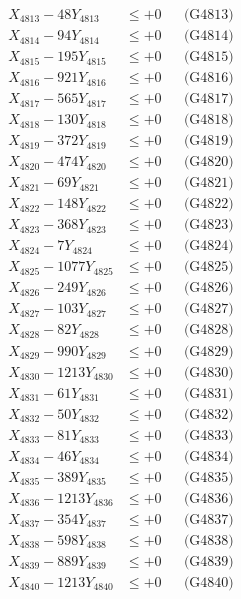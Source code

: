 \documentclass[a4paper,10pt]{article}
\begin{document}
{\begin{align}
X_{4813} - 48Y_{4813} &\leq +0 && \text{(G4813)} \\
X_{4814} - 94Y_{4814} &\leq +0 && \text{(G4814)} \\
X_{4815} - 195Y_{4815} &\leq +0 && \text{(G4815)} \\
X_{4816} - 921Y_{4816} &\leq +0 && \text{(G4816)} \\
X_{4817} - 565Y_{4817} &\leq +0 && \text{(G4817)} \\
X_{4818} - 130Y_{4818} &\leq +0 && \text{(G4818)} \\
X_{4819} - 372Y_{4819} &\leq +0 && \text{(G4819)} \\
X_{4820} - 474Y_{4820} &\leq +0 && \text{(G4820)} \\
\allowbreak
X_{4821} - 69Y_{4821} &\leq +0 && \text{(G4821)} \\
X_{4822} - 148Y_{4822} &\leq +0 && \text{(G4822)} \\
X_{4823} - 368Y_{4823} &\leq +0 && \text{(G4823)} \\
X_{4824} - 7Y_{4824} &\leq +0 && \text{(G4824)} \\
X_{4825} - 1077Y_{4825} &\leq +0 && \text{(G4825)} \\
X_{4826} - 249Y_{4826} &\leq +0 && \text{(G4826)} \\
X_{4827} - 103Y_{4827} &\leq +0 && \text{(G4827)} \\
X_{4828} - 82Y_{4828} &\leq +0 && \text{(G4828)} \\
X_{4829} - 990Y_{4829} &\leq +0 && \text{(G4829)} \\
X_{4830} - 1213Y_{4830} &\leq +0 && \text{(G4830)} \\
\allowbreak
X_{4831} - 61Y_{4831} &\leq +0 && \text{(G4831)} \\
X_{4832} - 50Y_{4832} &\leq +0 && \text{(G4832)} \\
X_{4833} - 81Y_{4833} &\leq +0 && \text{(G4833)} \\
X_{4834} - 46Y_{4834} &\leq +0 && \text{(G4834)} \\
X_{4835} - 389Y_{4835} &\leq +0 && \text{(G4835)} \\
X_{4836} - 1213Y_{4836} &\leq +0 && \text{(G4836)} \\
X_{4837} - 354Y_{4837} &\leq +0 && \text{(G4837)} \\
X_{4838} - 598Y_{4838} &\leq +0 && \text{(G4838)} \\
X_{4839} - 889Y_{4839} &\leq +0 && \text{(G4839)} \\
X_{4840} - 1213Y_{4840} &\leq +0 && \text{(G4840)} \\

\end{align}}
\end{document}

